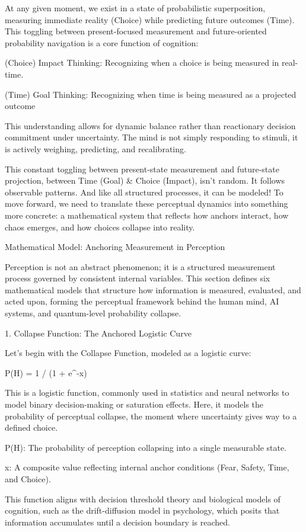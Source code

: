 \documentclass[11pt]{article}
\begin{document}
At any given moment, we exist in a state of probabilistic superposition, measuring immediate reality (Choice) while predicting future outcomes (Time). This toggling between present-focused measurement and future-oriented probability navigation is a core function of cognition:

(Choice) Impact Thinking: Recognizing when a choice is being measured in real-time.

(Time) Goal Thinking: Recognizing when time is being measured as a projected outcome

This understanding allows for dynamic balance rather than reactionary decision commitment under uncertainty. The mind is not simply responding to stimuli, it is actively weighing, predicting, and recalibrating. 

This constant toggling between present-state measurement and future-state projection, between Time (Goal) & Choice (Impact), isn’t random. It follows observable patterns. And like all structured processes, it can be modeled!
To move forward, we need to translate these perceptual dynamics into something more concrete: a mathematical system that reflects how anchors interact, how chaos emerges, and how choices collapse into reality.

Mathematical Model: Anchoring Measurement in Perception

Perception is not an abstract phenomenon; it is a structured measurement process governed by consistent internal variables. This section defines six mathematical models that structure how information is measured, evaluated, and acted upon, forming the perceptual framework behind the human mind, AI systems, and quantum-level probability collapse.

1. Collapse Function: The Anchored Logistic Curve

Let’s begin with the Collapse Function, modeled as a logistic curve:

P(H) = 1 / (1 + e^-x)

This is a logistic function, commonly used in statistics and neural networks to model binary decision-making or saturation effects. Here, it models the probability of perceptual collapse, the moment where uncertainty gives way to a defined choice.

P(H): The probability of perception collapsing into a single measurable state.

x: A composite value reflecting internal anchor conditions (Fear, Safety, Time, and Choice).

This function aligns with decision threshold theory and biological models of cognition, such as the drift-diffusion model in psychology, which posits that information accumulates until a decision boundary is reached.
\end{document}
